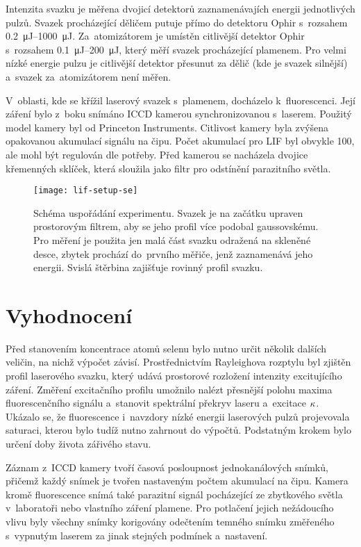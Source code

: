 Intenzita svazku je měřena dvojicí detektorů
zaznamenávajích energii jednotlivých pulzů.
Svazek procházející děličem putuje přímo do detektoru
Ophir 
s~rozsahem \SIrange{0.2}{1000}{\micro\joule}.
Za~atomizátorem je umístěn citlivější detektor
Ophir 
s~rozsahem \SIrange{0.1}{200}{\micro\joule},
který měří svazek procházející plamenem.
Pro velmi nízké energie pulzu je citlivější detektor přesunut
za dělič (kde je svazek silnější) a~svazek za~atomizátorem není měřen.

V~oblasti, kde se křížil laserový svazek s~plamenem, docházelo k~fluorescenci.
Její záření bylo z~boku snímáno ICCD kamerou synchronizovanou s~laserem.
Použitý model kamery byl  od Princeton Instruments.
Citlivost kamery byla zvýšena opakovanou akumulací signálu na čipu.
Počet akumulací pro LIF byl obvykle 100, ale mohl být regulován dle potřeby.
Před kamerou se nacházela dvojice křemenných sklíček,
která sloužila jako filtr pro odstínění parazitního světla.

\begin{figure}[htb]
	\centering
	\texttt{[image: lif-setup-se]}
	\caption{Schéma uspořádání experimentu.
		Svazek je na začátku upraven prostorovým filtrem,
		aby se jeho profil více podobal gaussovskému.
		Pro měření je použita jen malá část svazku odražená na skleněné desce,
		zbytek prochází do~prvního měřiče, jenž zaznamenává jeho energii.
		Svislá štěrbina zajišťuje rovinný profil svazku.}
	\label{fig:lif-setup}
\end{figure}

\section{Vyhodnocení}
\label{sec:lif-method}
Před stanovením koncentrace atomů selenu bylo nutno určit několik
dalších veličin, na nichž výpočet závisí.
Prostřednictvím Rayleighova rozptylu byl zjištěn profil laserového svazku,
který udává prostorové rozložení intenzity excitujícího záření.
Změření excitačního profilu umožnilo nalézt přesnější polohu maxima
fluorescenčního signálu
a~stanovit spektrální překryv laseru a~excitace $\kappa$.
Ukázalo se, že fluorescence i~navzdory nízké energii laserových pulzů
projevovala saturaci, kterou bylo tudíž nutno zahrnout do výpočtů.
Podstatným krokem bylo určení doby života zářivého stavu.

Záznam z~ICCD kamery tvoří časová posloupnost jednokanálových sním\-ků,
přičemž každý snímek je tvořen nastaveným počtem akumulací na čipu.
Kamera kromě fluorescence snímá také parazitní signál pocházející
ze zbytkového světla v~laboratoři nebo vlastního záření plamene.
Pro potlačení jejich nežádoucího vlivu
byly všechny snímky korigovány odečtením temného snímku změřeného
s~vypnutým laserem za jinak stejných podmínek a~nastavení.

